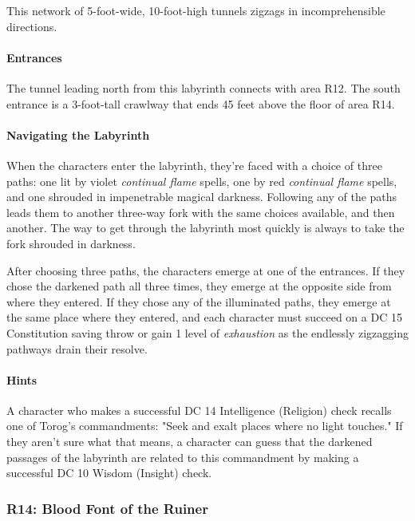 \documentclass[letterpaper, 11pt, bg=full, twocolumn]{dndbook}
\begin{document}
This network of 5-foot-wide, 10-foot-high tunnels zigzags in incomprehensible directions.

\paragraph{Entrances}

The tunnel leading north from this labyrinth connects with area R12. The south entrance is a 3-foot-tall crawlway that ends 45 feet above the floor of area R14.

\paragraph{Navigating the Labyrinth}

When the characters enter the labyrinth, they're faced with a choice of three paths: one lit by violet \textit{continual flame} spells, one by red \textit{continual flame} spells, and one shrouded in impenetrable magical darkness. Following any of the paths leads them to another three-way fork with the same choices available, and then another. The way to get through the labyrinth most quickly is always to take the fork shrouded in darkness.

After choosing three paths, the characters emerge at one of the entrances. If they chose the darkened path all three times, they emerge at the opposite side from where they entered. If they chose any of the illuminated paths, they emerge at the same place where they entered, and each character must succeed on a DC 15 Constitution saving throw or gain 1 level of \textit{exhaustion} as the endlessly zigzagging pathways drain their resolve.

\paragraph{Hints}

A character who makes a successful DC 14 Intelligence (Religion) check recalls one of Torog's commandments: "Seek and exalt places where no light touches." If they aren't sure what that means, a character can guess that the darkened passages of the labyrinth are related to this commandment by making a successful DC 10 Wisdom (Insight) check.

\subsubsection{R14: Blood Font of the Ruiner}
\end{document}
